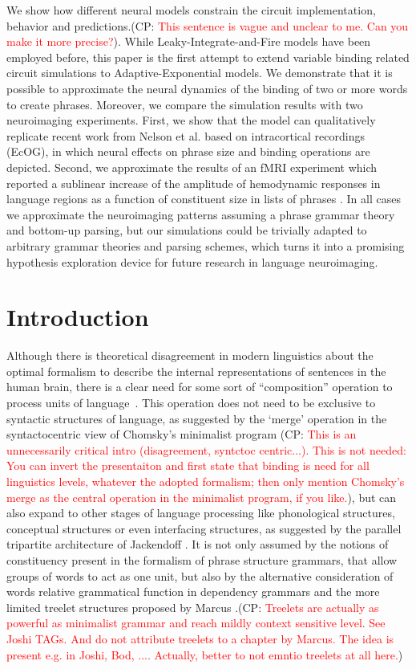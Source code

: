 \documentclass[10pt]{article}
\newcommand{\noteCP}[1]{(CP: \textcolor{red}{#1})}
\begin{document}
We show how different neural models constrain the circuit
implementation, behavior and predictions.\noteCP{This sentence is
  vague and unclear to me. Can you make it more precise?}. While
Leaky-Integrate-and-Fire models have been employed before, this paper
is the first attempt to extend variable binding related circuit
simulations to Adaptive-Exponential models. We demonstrate that it is
possible to approximate the neural dynamics of the binding of two or
more words to create phrases. Moreover, we compare the simulation
results with two neuroimaging experiments. First, we show that the
model can qualitatively replicate recent work from Nelson et al.
\cite{Nelson_2017} based on intracortical recordings (EcOG), in which
neural effects on phrase size and binding operations are depicted.
Second, we approximate the results of an fMRI experiment which
reported a sublinear increase of the amplitude of hemodynamic
responses in language regions as a function of constituent size in
lists of phrases \cite{Pallier_2011}. In all cases we approximate the
neuroimaging patterns assuming a phrase grammar theory and bottom-up
parsing, but our simulations could be trivially adapted to arbitrary
grammar theories and parsing schemes, which turns it into a promising
hypothesis exploration device for future research in language
neuroimaging.

\section{Introduction}

{\label{931947}}

Although there is theoretical disagreement in modern linguistics about
the optimal formalism to describe the internal representations of
sentences in the human brain, there is a clear need for some sort of
``composition'' operation to process units of
language~\cite{Dehaene_2015}. This operation does not need to be
exclusive to syntactic structures of language, as suggested by the
`merge' operation in the syntactocentric view of Chomsky's minimalist
program \cite{Chomsky_2013}\noteCP{This is an unnecessarily critical
  intro (disagreement, syntctoc centric...). This is not needed: You
  can invert the presentaiton and first state that binding is need for
  all linguistics levels, whatever the adopted formalism; then only
  mention Chomsky's merge as the central operation in the minimalist
  program, if you like.}, but can also expand to other stages of
language processing like phonological structures, conceptual
structures or even interfacing structures, as suggested by the
parallel tripartite architecture of Jackendoff
\cite{Jackendoff_2002a}. It is not only assumed by the notions of
constituency present in the formalism of phrase structure grammars,
that allow groups of words to act as one unit, but also by the
alternative consideration of words relative grammatical function in
dependency grammars and the more limited treelet structures proposed
by Marcus \cite{marcus01}.\noteCP{Treelets are actually as powerful as
  minimalist grammar and reach mildly context sensitive level. See
  Joshi TAGs. And do not attribute treelets to a chapter by Marcus.
  The idea is present e.g. in Joshi, Bod, .... Actually, better to not
  emntio treelets at all here.}
\end{document}
